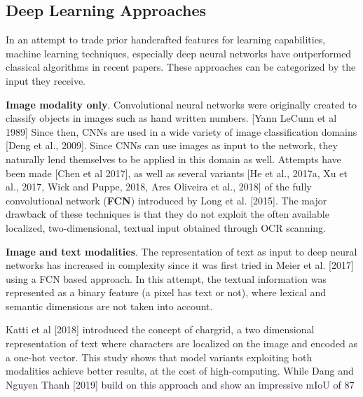 \documentclass[english, bibtex]{kththesis}
\begin{document}
\subsection{Deep Learning Approaches}

In an attempt to trade prior handcrafted features for learning capabilities, machine learning techniques, especially deep neural networks have outperformed classical algorithms in recent papers. These approaches can be categorized by the input they receive.

\textbf{Image modality only}. Convolutional neural networks were originally created to classify objects in images such as hand written numbers. [Yann LeCunn et al 1989] Since then, CNNs are used in a wide variety of image classification domains [Deng et al., 2009]. Since CNNs can use images as input to the network, they naturally lend themselves to be applied in this domain as well. Attempts have been made [Chen et al 2017], as well as several variants [He et al., 2017a, Xu et al., 2017, Wick and Puppe, 2018, Ares Oliveira et al., 2018] of the fully convolutional network (\textbf{FCN}) introduced by Long et al. [2015]. The major drawback of these techniques is that they do not exploit the often available localized, two-dimensional, textual input obtained through OCR scanning.  

\textbf{Image and text modalities}. The representation of text as input to deep neural networks has increased in complexity since it was first tried in Meier et al. [2017] using a FCN based approach. In this attempt, the textual information was represented as a binary feature (a pixel has text or not), where lexical and semantic dimensions are not taken into account. 

Katti et al [2018] introduced the concept of chargrid, a two dimensional representation of text where characters are localized on the image and encoded as a one-hot vector. This study shows that model variants exploiting both modalities achieve better results, at the cost of high-computing. While Dang and Nguyen Thanh [2019] build on this approach and show an impressive mIoU of 87%
\end{document}
